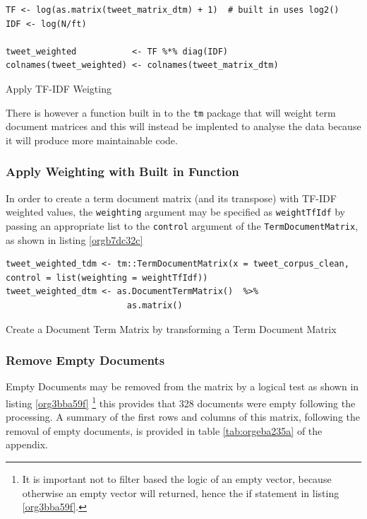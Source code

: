 \documentclass[11pt]{article}
\begin{document}
\begin{enumerate}
\begin{listing}[htbp]
\begin{verbatim}
TF <- log(as.matrix(tweet_matrix_dtm) + 1)  # built in uses log2()
IDF <- log(N/ft)

tweet_weighted           <- TF %*% diag(IDF)
colnames(tweet_weighted) <- colnames(tweet_matrix_dtm)
\end{verbatim}
\caption{\label{org12df63a}Apply TF-IDF Weigting}
\end{listing}

There is however a function built in to the \texttt{tm} package that will weight term document matrices and this will instead be implented to analyse the data because it will produce more maintainable code.
\end{enumerate}

\subsubsection{Apply Weighting with Built in Function}
\label{sec:orgf994c06}
In order to create a term document matrix (and its transpose) with TF-IDF weighted values, the \texttt{weighting} argument may be specified as \texttt{weightTfIdf} by passing an appropriate list to the \texttt{control} argument of the \texttt{TermDocumentMatrix}, as shown in listing \ref{orgb7dc32c}

\begin{listing}[htbp]
\begin{verbatim}
tweet_weighted_tdm <- tm::TermDocumentMatrix(x = tweet_corpus_clean, control = list(weighting = weightTfIdf))
tweet_weighted_dtm <- as.DocumentTermMatrix()  %>%
                        as.matrix()
\end{verbatim}
\caption{\label{orgb7dc32c}Create a Document Term Matrix by transforming a Term Document Matrix}
\end{listing}

\subsubsection{Remove Empty Documents}
\label{sec:org2bacc86}
Empty Documents may be removed from the matrix by a logical test as shown in listing  \ref{org3bba59f} \footnote{It is important not to filter based the logic of an empty vector, because
otherwise an empty vector will returned, hence the if statement in listing \ref{org3bba59f}.} this provides that 328 documents were empty following the processing. A summary of the first rows and columns of this matrix, following the removal of empty documents, is provided in table \ref{tab:orgeba235a} of the appendix.
\end{document}
